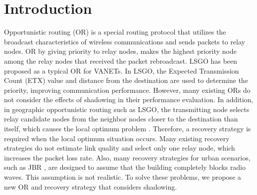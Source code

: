 \documentclass{comex}
\begin{document}







\section{Introduction}
Opportunistic routing (OR) \cite{opportunistic} is a special routing protocol that utilizes the broadcast characteristics of wireless communications and sends packets to relay nodes.
OR by giving priority to relay nodes, makes the highest priority node among the relay nodes that received the packet rebroadcast.
LSGO\cite{LSGO} has been proposed as a typical OR for VANETs.  
In LSGO, the Expected Transmission Count (ETX) value and distance from the destination are used to determine the priority, improving communication performance. 
However, many existing ORs do not consider the effects of shadowing in their performance evaluation.
In addition, in geographic opportunistic routing such as LSGO, the transmitting node selects relay candidate nodes from the neighbor nodes  closer to the destination than itself, which causes the local optimum problem \cite{geographic}. 
Therefore, a recovery strategy is required when the local optimum situation occurs. 
Many existing recovery strategies do not estimate link quality and select only one relay node, which increases the packet loss rate. 
Also, many recovery strategies for urban scenarios, such as JBR \cite{JBR}, are designed to assume that the building completely blocks radio waves.
This assumption is not realistic. To solve these problems, we propose a new OR and recovery strategy that considers shadowing.
\end{document}
